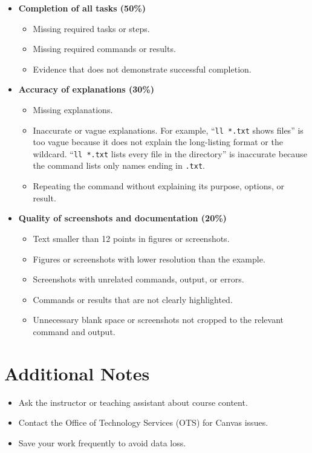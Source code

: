\documentclass[12pt]{article}
\begin{document}
\begin{itemize}[nosep,leftmargin=*]
	\item \textbf{Completion of all tasks (50\%)}
	      \begin{itemize}[nosep]
		      \item Missing required tasks or steps.
		      \item Missing required commands or results.
		      \item Evidence that does not demonstrate successful completion.
	      \end{itemize}

	\item \textbf{Accuracy of explanations (30\%)}
	      \begin{itemize}[nosep]
		      \item Missing explanations.
		      \item Inaccurate or vague explanations. For example,
		            ``\texttt{ll *.txt} shows files'' is too vague because it
		            does not explain the long-listing format or the wildcard.
		            ``\texttt{ll *.txt} lists every file in the directory'' is
		            inaccurate because the command lists only names ending in
		            \texttt{.txt}.
		      \item Repeating the command without explaining its purpose,
		            options, or result.
	      \end{itemize}

	\item \textbf{Quality of screenshots and documentation (20\%)}
	      \begin{itemize}[nosep]
		      \item Text smaller than 12 points in figures or screenshots.
		      \item Figures or screenshots with lower resolution than the
		            example.
		      \item Screenshots with unrelated commands, output, or errors.
		      \item Commands or results that are not clearly highlighted.
		      \item Unnecessary blank space or screenshots not cropped to the
		            relevant command and output.
	      \end{itemize}
\end{itemize}

\section*{Additional Notes}
\begin{itemize}[nosep,leftmargin=*]
	\item Ask the instructor or teaching assistant about course content.
	\item Contact the Office of Technology Services (OTS) for Canvas issues.
	\item Save your work frequently to avoid data loss.
\end{itemize}
\end{document}
